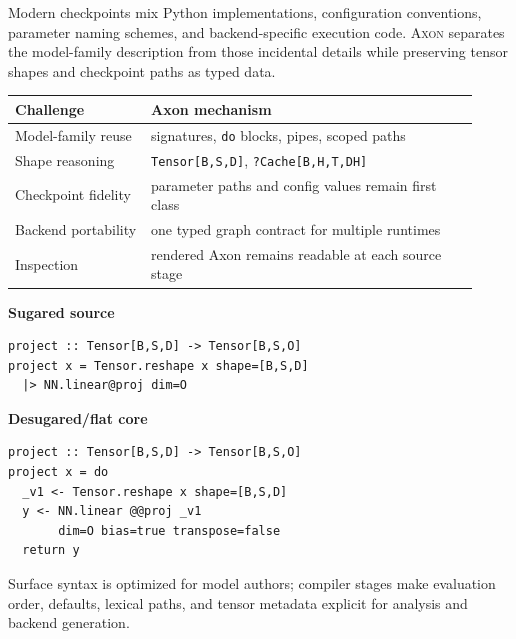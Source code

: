 \documentclass{article}
\newcommand{\axon}{\textsc{Axon}}
\newcommand{\code}[1]{\texttt{#1}}
\newcommand{\postertext}[1]{{\raggedright\fontsize{23}{29}\selectfont #1\par}}
\begin{document}
\noindent
\begin{minipage}[t]{0.49\linewidth}
\begin{tcolorbox}[posterbox,title={Why Axon?}]
\postertext{Modern checkpoints mix Python implementations, configuration
conventions, parameter naming schemes, and backend-specific execution code.
\axon{} separates the model-family description from those incidental details
while preserving tensor shapes and checkpoint paths as typed data.}
\vspace{3mm}
{\fontsize{21}{27}\selectfont
\begin{tabular}{@{}p{0.27\linewidth}p{0.65\linewidth}@{}}
\toprule
Challenge & Axon mechanism \\
\midrule
Model-family reuse & signatures, \code{do} blocks, pipes, scoped paths \\
Shape reasoning & \code{Tensor[B,S,D]}, \code{?Cache[B,H,T,DH]} \\
Checkpoint fidelity & parameter paths and config values remain first class \\
Backend portability & one typed graph contract for multiple runtimes \\
Inspection & rendered Axon remains readable at each source stage \\
\bottomrule
\end{tabular}
}
\end{tcolorbox}

\vspace{7mm}

\begin{tcolorbox}[posterbox,title={Surface Sugar $\rightarrow$ Flat Core}]
\begin{minipage}[t]{0.49\linewidth}
{\fontsize{22}{26}\selectfont\bfseries Sugared source}
\begin{tcolorbox}[codebox]
\begin{lstlisting}[basicstyle=\ttfamily\fontsize{18}{20}\selectfont]
project :: Tensor[B,S,D] -> Tensor[B,S,O]
project x = Tensor.reshape x shape=[B,S,D]
  |> NN.linear@proj dim=O
\end{lstlisting}
\end{tcolorbox}
\end{minipage}
\hfill
\begin{minipage}[t]{0.49\linewidth}
{\fontsize{22}{26}\selectfont\bfseries Desugared/flat core}
\begin{tcolorbox}[codebox]
\begin{lstlisting}[basicstyle=\ttfamily\fontsize{18}{20}\selectfont]
project :: Tensor[B,S,D] -> Tensor[B,S,O]
project x = do
  _v1 <- Tensor.reshape x shape=[B,S,D]
  y <- NN.linear @@proj _v1
       dim=O bias=true transpose=false
  return y
\end{lstlisting}
\end{tcolorbox}
\end{minipage}
\vspace{2mm}
{\raggedright\fontsize{22}{28}\selectfont Surface syntax is optimized for
model authors; compiler stages make evaluation order, defaults, lexical paths,
and tensor metadata explicit for analysis and backend generation.\par}
\end{tcolorbox}
\end{minipage}
\end{document}
